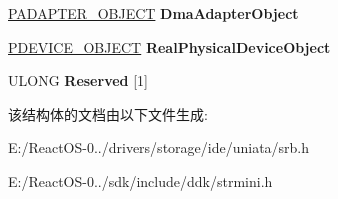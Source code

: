\begin{DoxyCompactItemize}
\item 
\mbox{\label{struct___p_o_r_t___c_o_n_f_i_g_u_r_a_t_i_o_n___i_n_f_o_r_m_a_t_i_o_n_a935ee28c113dc6f7478764f4e3b225d9}} 
\hyperlink{struct___d_m_a___a_d_a_p_t_e_r}{P\+A\+D\+A\+P\+T\+E\+R\+\_\+\+O\+B\+J\+E\+CT} {\bfseries Dma\+Adapter\+Object}
\item 
\mbox{\label{struct___p_o_r_t___c_o_n_f_i_g_u_r_a_t_i_o_n___i_n_f_o_r_m_a_t_i_o_n_a129fa86520541a92f8c1de6986d85d15}} 
\hyperlink{struct___d_e_v_i_c_e___o_b_j_e_c_t}{P\+D\+E\+V\+I\+C\+E\+\_\+\+O\+B\+J\+E\+CT} {\bfseries Real\+Physical\+Device\+Object}
\item 
\mbox{\label{struct___p_o_r_t___c_o_n_f_i_g_u_r_a_t_i_o_n___i_n_f_o_r_m_a_t_i_o_n_aff5725a5a65415e2bdd49a81ff8108e8}} 
U\+L\+O\+NG {\bfseries Reserved} \mbox{[}1\mbox{]}
\end{DoxyCompactItemize}


该结构体的文档由以下文件生成\+:\begin{DoxyCompactItemize}
\item 
E\+:/\+React\+O\+S-\/0../drivers/storage/ide/uniata/srb.\+h\item 
E\+:/\+React\+O\+S-\/0../sdk/include/ddk/strmini.\+h\end{DoxyCompactItemize}
